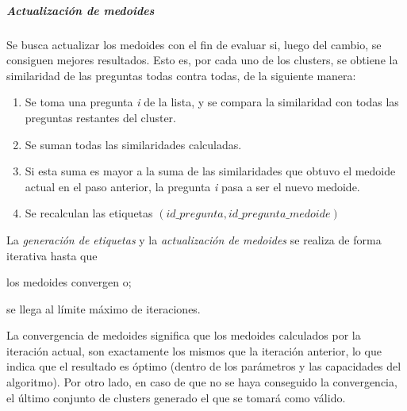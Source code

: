 \subparagraph{Actualización de medoides}
Se busca actualizar los medoides con el fin de evaluar si, luego del cambio, se consiguen mejores resultados. Esto es, por cada uno de los clusters, se obtiene la similaridad de las preguntas todas contra todas, de la siguiente manera:

\begin{enumerate}
	\item Se toma una pregunta \textit{i} de la lista, y se compara la similaridad con todas las preguntas restantes del cluster.
	\item Se suman todas las similaridades calculadas.
	\item Si esta suma es mayor a la suma de las similaridades que obtuvo el medoide actual en el paso anterior, la pregunta \textit{i} pasa a ser el nuevo medoide.
	\item Se recalculan las etiquetas \((id\_pregunta, id\_pregunta\_medoide)\)
\end{enumerate}

La \textit{generación de etiquetas} y la \textit{actualización de medoides} se realiza de forma iterativa hasta que \begin{enumerate*} [label=(\roman*)] \item los medoides convergen o; \item se llega al límite máximo de iteraciones.\end{enumerate*} La convergencia de medoides significa que los medoides calculados por la iteración actual, son exactamente los mismos que la iteración anterior, lo que indica que el resultado es óptimo (dentro de los parámetros y las capacidades del algoritmo). Por otro lado, en caso de que no se haya conseguido la convergencia, el último conjunto de clusters generado el que se tomará como válido.

